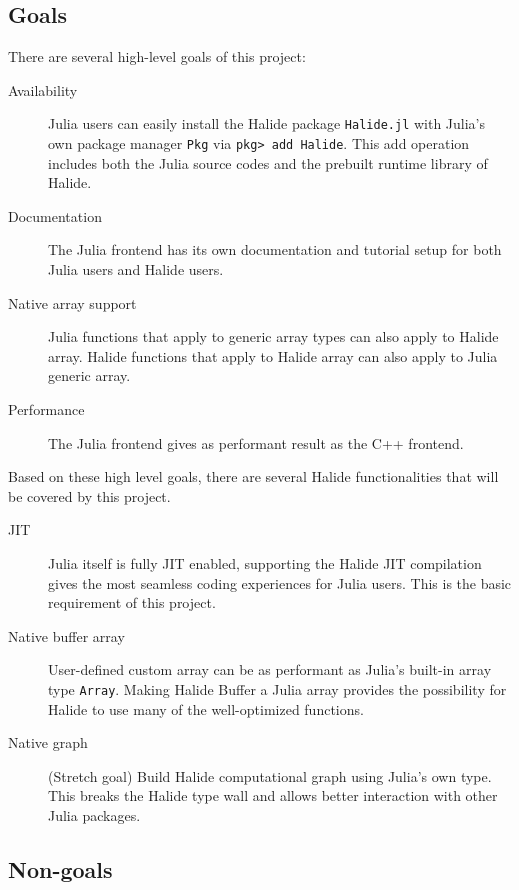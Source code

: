 \documentclass{article}
\begin{document}

\subsection{Goals}

There are several high-level goals of this project:

\begin{description}
    \item[Availability] Julia users can easily install the Halide package \lstinline{Halide.jl} with Julia's own package manager \lstinline{Pkg} via \lstinline{pkg> add Halide}. This add operation includes both the Julia source codes and the prebuilt runtime library of Halide.
    \item[Documentation] The Julia frontend has its own documentation and tutorial setup for both Julia users and Halide users.
    \item[Native array support] Julia functions that apply to generic array types can also apply to Halide array. Halide functions that apply to Halide array can also apply to Julia generic array.
    \item[Performance] The Julia frontend gives as performant result as the C++ frontend.
\end{description}

Based on these high level goals, there are several Halide functionalities that will be covered by this project.

\begin{description}
    \item[JIT] Julia itself is fully JIT enabled, supporting the Halide JIT compilation gives the most seamless coding experiences for Julia users. This is the basic requirement of this project.
    \item[Native buffer array] User-defined custom array can be as performant as Julia's built-in array type \lstinline{Array}. Making Halide Buffer a Julia array provides the possibility for Halide to use many of the well-optimized functions.
    \item[Native graph] (Stretch goal) Build Halide computational graph using Julia's own type. This breaks the Halide type wall and allows better interaction with other Julia packages.
\end{description}

\subsection{Non-goals}
\end{document}
